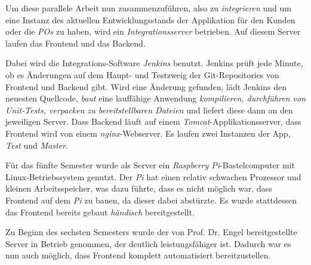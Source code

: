 \documentclass[a4paper, 11pt]{article}
\begin{document}
Um diese parallele Arbeit nun zusammenzuführen, also zu \emph{integrieren} und
um eine Instanz des aktuellen Entwicklungsstands der Applikation für den Kunden
oder die \emph{POs} zu haben, wird ein \emph{Integrationsserver} betrieben.
Auf diesem Server laufen das Frontend und das Backend.

Dabei wird die Integrations-Software \emph{Jenkins} benutzt. Jenkins prüft jede
Minute, ob es Änderungen auf dem Haupt- und Testzweig der Git-Repositories von
Frontend und Backend gibt. Wird eine Änderung gefunden, lädt Jenkins den
neuesten Quellcode, \emph{baut} eine lauffähige Anwendung \emph{kompilieren,
durchführen von Unit-Tests, verpacken zu bereitstellbaren Dateien} und liefert
diese dann an den jeweiligen Server. Dass Backend läuft auf einem
\emph{Tomcat}-Applikationsserver, dass Frontend wird von einem
\emph{nginx}-Webserver. Es laufen zwei Instanzen der App, \emph{Test} und \emph{Master}.

Für das fünfte Semester wurde als Server ein \emph{Raspberry Pi}-Bastelcomputer
mit Linux-Betriebssystem genutzt. Der \emph{Pi} hat einen relativ schwachen
Prozessor und kleinen Arbeitsspeicher, was dazu führte, dass es nicht möglich
war, dass Frontend auf dem \emph{Pi} zu bauen, da dieser dabei abstürzte. Es
wurde stattdessen das Frontend bereits gebaut \emph{händisch} bereitgestellt.

Zu Beginn des sechsten Semesters wurde der von Prof. Dr. Engel bereitgestellte
Server in Betrieb genommen, der deutlich leistungsfähiger ist. Dadurch war es
nun auch möglich, dass Frontend komplett automatisiert bereitzustellen. 
\end{document}
